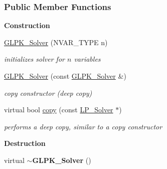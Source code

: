 \subsubsection*{Public Member Functions}
\begin{Indent}\textbf{ Construction}\par
\begin{DoxyCompactItemize}
\item 
\mbox{\label{group___c_l_s_solvers_a290ed6f0f6be3c6edf5ec5b5f5bfbb3a}} 
\hyperlink{group___c_l_s_solvers_a290ed6f0f6be3c6edf5ec5b5f5bfbb3a}{G\+L\+P\+K\+\_\+\+Solver} (N\+V\+A\+R\+\_\+\+T\+Y\+PE n)
\begin{DoxyCompactList}\small\item\em initializes solver for $ n $ variables \end{DoxyCompactList}\item 
\mbox{\label{group___c_l_s_solvers_a6cbd7db2555c39cb789fa45a8ad22f8f}} 
\hyperlink{group___c_l_s_solvers_a6cbd7db2555c39cb789fa45a8ad22f8f}{G\+L\+P\+K\+\_\+\+Solver} (const \hyperlink{group___c_l_s_solvers_class_g_l_p_k___solver}{G\+L\+P\+K\+\_\+\+Solver} \&)
\begin{DoxyCompactList}\small\item\em copy constructor (deep copy) \end{DoxyCompactList}\item 
virtual bool \hyperlink{group___c_l_s_solvers_aff3a58ef3def363dfad9e0ba8eee3e67}{copy} (const \hyperlink{group___c_l_s_solvers_class_l_p___solver}{L\+P\+\_\+\+Solver} $\ast$)
\begin{DoxyCompactList}\small\item\em performs a deep copy, similar to a copy constructor \end{DoxyCompactList}\end{DoxyCompactItemize}
\end{Indent}
\begin{Indent}\textbf{ Destruction}\par
\begin{DoxyCompactItemize}
\item 
\mbox{\label{group___c_l_s_solvers_a4a4505a58f6d0f93a1c003797b39e468}} 
virtual {\bfseries $\sim$\+G\+L\+P\+K\+\_\+\+Solver} ()
\end{DoxyCompactItemize}
\end{Indent}
